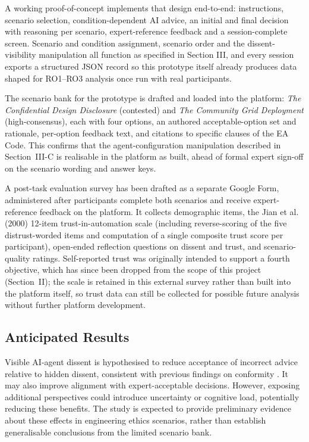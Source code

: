 \documentclass[conference]{IEEEtran}
\begin{document}
A working proof-of-concept implements that design end-to-end: instructions, scenario selection, condition-dependent AI advice, an initial and final decision with reasoning per scenario, expert-reference feedback and a session-complete screen. Scenario and condition assignment, scenario order and the dissent-visibility manipulation all function as specified in Section III, and every session exports a structured JSON record so this prototype itself already produces data shaped for RO1--RO3 analysis once run with real participants.

The scenario bank for the prototype is drafted and loaded into the platform: \textit{The Confidential Design Disclosure} (contested) and \textit{The Community Grid Deployment} (high-consensus), each with four options, an authored acceptable-option set and rationale, per-option feedback text, and citations to specific clauses of the EA Code. This confirms that the agent-configuration manipulation described in Section~III-C is realisable in the platform as built, ahead of formal expert sign-off on the scenario wording and answer keys.

A post-task evaluation survey has been drafted as a separate Google Form, administered after participants complete both scenarios and receive expert-reference feedback on the platform. It collects demographic items, the Jian et al. (2000) 12-item trust-in-automation scale (including reverse-scoring of the five distrust-worded items and computation of a single composite trust score per participant), open-ended reflection questions on dissent and trust, and scenario-quality ratings. Self-reported trust was originally intended to support a fourth objective, which has since been dropped from the scope of this project (Section~II); the scale is retained in this external survey rather than built into the platform itself, so trust data can still be collected for possible future analysis without further platform development.

\subsection{Anticipated Results}
Visible AI-agent dissent is hypothesised to reduce acceptance of incorrect advice relative to hidden dissent, consistent with previous findings on conformity \cite{tsuchiya2026multiaiadvice}. It may also improve alignment with expert-acceptable decisions. However, exposing additional perspectives could introduce uncertainty or cognitive load, potentially reducing these benefits. The study is expected to provide preliminary evidence about these effects in engineering ethics scenarios, rather than establish generalisable conclusions from the limited scenario bank.
\end{document}
